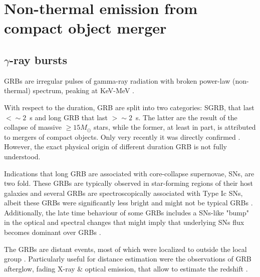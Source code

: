
\chapter{Non-thermal emission from compact object merger} %

\label{ch:afg} %


\section{$\gamma$-ray bursts}

\acp{GRB} are irregular pulses of gamma-ray radiation with broken power-law (non-thermal) spectrum, peaking at KeV-MeV \citep{Band:1993,Kouveliotou:1993,Meegan:1992xg}.

With respect to the duration, \ac{GRB} are split into two categories: \ac{SGRB}, that last $< \sim 2$~s and long \ac{GRB} that last $> \sim 2$~s. The latter are the result of the collapse of massive $\geq 15M_{\odot}$ stars, while the former, at least in part, is attributed to mergers of compact objects. Only very recently it was directly confirmed \citep{TheLIGOScientific:2017qsa}. However, the exact physical origin of different duration \ac{GRB} is not fully understood.

Indications that long \ac{GRB} are associated with core-collapse supernovae, \acp{SN}, are two fold. These \acp{GRB} are typically observed in star-forming regions of their host galaxies \citep[\eg][]{Bloom:2000pq,Bloom:2002hc,Fruchter:2006py,Christensen:2004yx,CastroCeron:2006jh} and several \acp{GRB} are spectroscopically associated with Type Ic \acp{SN}, albeit these \acp{GRB} were significantly less bright and might not be typical \acp{GRB} \citep[\eg][]{Liang:2006ci,Bromberg:2011fm}. Additionally, the late time behaviour of some \acp{GRB} includes a \acp{SN}-like "bump" in the optical and spectral changes that might imply that underlying \acp{SN} flux becomes dominant over \acp{GRB} \citep[\eg][]{Bloom:1999,Woosley:2006fn}.

The \acp{GRB} are distant events, most of which were localized to outside the local group \citep[\eg][]{Mao:1992,Piran:1992,Fenimore:1993}. Particularly useful for distance estimation were the observations of \ac{GRB} afterglow, fading X-ray \& optical emission, that allow to estimate the redshift
\citep[\eg][]{Costa:1997cg,Frontera:1997ae}.


